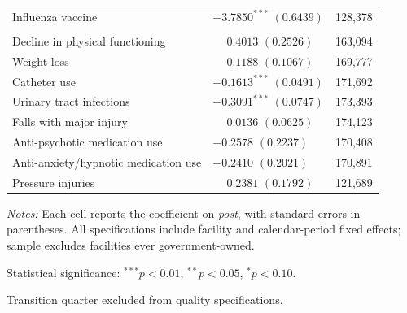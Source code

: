 \begin{table}[!ht]
\begin{threeparttable}
\begin{tabularx}{\textwidth}{@{} l Y r @{}}
Influenza vaccine &  & 128,378 \\
\addlinespace[4pt]
 \\[2pt]
Decline in physical functioning &  & 163,094 \\
Weight loss &  & 169,777 \\
Catheter use &  & 171,692 \\
Urinary tract infections &  & 173,393 \\
Falls with major injury &  & 174,123 \\
Anti-psychotic medication use &  & 170,408 \\
Anti-anxiety/hypnotic medication use &  & 170,891 \\
Pressure injuries &  & 121,689 \\
\bottomrule
\end{tabularx}

\begin{tablenotes}[flushleft]
\footnotesize
\item \textit{Notes:} Each cell reports the coefficient on \textit{post}, with standard errors in parentheses. All specifications include facility and calendar-period fixed effects; sample excludes facilities ever government-owned.
\item Statistical significance: $^{***}p<0.01$, $^{**}p<0.05$, $^{*}p<0.10$.
\item Transition quarter excluded from quality specifications.
\end{tablenotes}
\end{threeparttable}
\end{table}

